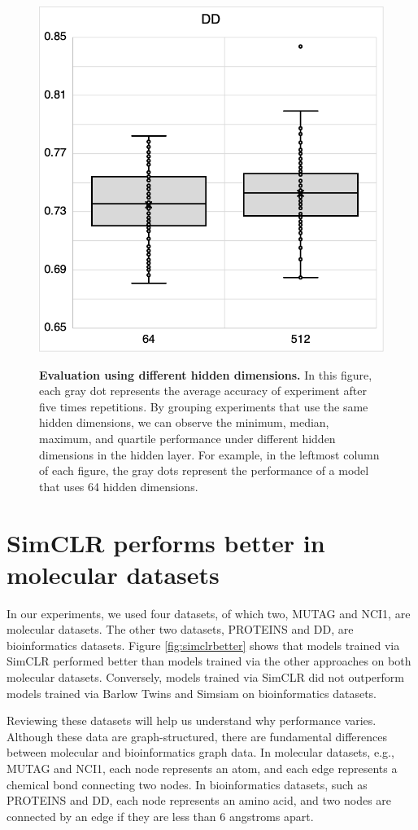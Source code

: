\begin{figure}[htbp]
{        \includegraphics[width = .48\linewidth]{./figures/5-DD.png}}
\vspace{0.5cm}
\caption[Evaluation using different hidden dimensions]{\textbf{Evaluation using different hidden dimensions.} In this figure, each gray dot represents the average accuracy of experiment after five times repetitions. By grouping experiments that use the same hidden dimensions, we can observe the minimum, median, maximum, and quartile performance under different hidden dimensions in the hidden layer. For example, in the leftmost column of each figure, the gray dots represent the performance of a model that uses 64 hidden dimensions.}\label{fig:hidden}
\end{figure}




\section{SimCLR performs better in molecular datasets}

In our experiments, we used four datasets, of which two, MUTAG and NCI1, are molecular datasets. The other two datasets, PROTEINS and DD, are bioinformatics datasets. Figure \ref{fig:simclrbetter} shows that models trained via SimCLR performed better than models trained via the other approaches on both molecular datasets. Conversely, models trained via SimCLR did not outperform models trained via Barlow Twins and Simsiam on bioinformatics datasets.

Reviewing these datasets will help us understand why performance varies. Although these data are graph-structured, there are fundamental differences between molecular and bioinformatics graph data. In molecular datasets, e.g., MUTAG and NCI1, each node represents an atom, and each edge represents a chemical bond connecting two nodes. In bioinformatics datasets, such as PROTEINS and DD, each node represents an amino acid, and two nodes are connected by an edge if they are less than 6 angstroms apart.

